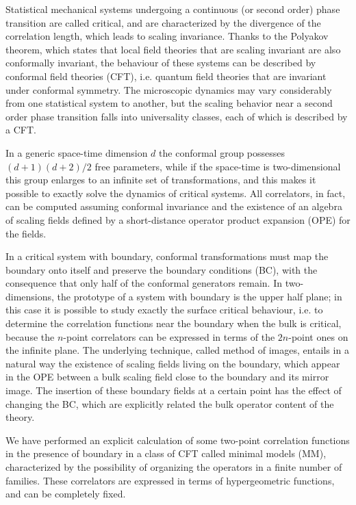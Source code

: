 \documentclass[a4paper,12pt]{report}
\begin{document}
Statistical mechanical systems undergoing a continuous (or second order) phase transition are called critical, and
are characterized by the divergence of the correlation length, which leads to scaling invariance. Thanks to the
Polyakov theorem, which states that local field theories that are scaling invariant are also conformally
invariant, the behaviour of these systems can be described by conformal field theories (CFT), i.e. quantum field
theories that are invariant under conformal symmetry. The microscopic dynamics may vary considerably from one
statistical system to another, but the scaling behavior near a second order phase transition falls into
universality classes, each of which is described by a CFT.

In a generic space-time dimension $d$ the conformal group possesses $(d+1)(d+2)/2$ free parameters, while if the
space-time is two-dimensional this group enlarges to an infinite set of transformations, and this makes it
possible to exactly solve the dynamics of critical systems. All correlators, in fact, can be computed assuming
conformal invariance and the existence of an algebra of scaling fields defined by a short-distance operator
product expansion (OPE) for the fields.

In a critical system with boundary, conformal transformations must map the boundary onto itself and preserve the
boundary conditions (BC), with the consequence that only half of the conformal generators remain. In
two-dimensions, the prototype of a system with boundary is the upper half plane; in this case it is possible to
study exactly the surface critical behaviour, i.e. to determine the correlation functions near the boundary when
the bulk is critical, because the $n$-point correlators can be expressed in terms of the $2n$-point ones on the
infinite plane. The underlying technique, called method of images, entails in a natural way the existence of
scaling fields living on the boundary, which appear in the OPE between a bulk scaling field close to the boundary
and its mirror image. The insertion of these boundary fields at a certain point has the effect of changing the BC,
which are explicitly related the bulk operator content of the theory.

We have performed an explicit calculation of some two-point correlation functions in the presence of boundary in a
class of CFT called minimal models (MM), characterized by the possibility of organizing the operators in a finite
number of families. These correlators are expressed in terms of hypergeometric functions, and can be completely
fixed.
\end{document}
